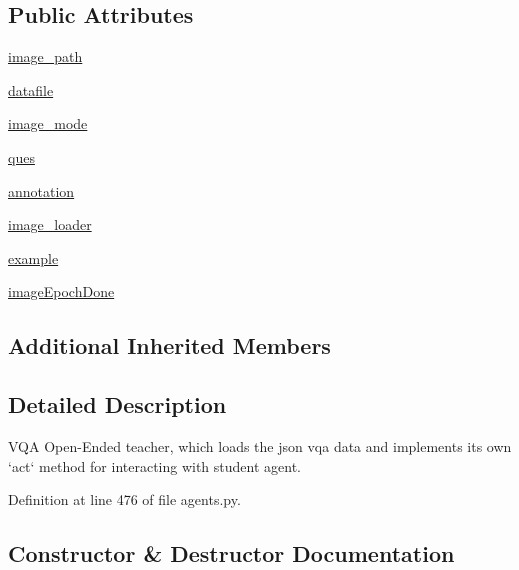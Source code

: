 \subsection*{Public Attributes}
\begin{DoxyCompactItemize}
\item 
\hyperlink{classparlai_1_1tasks_1_1vqa__v1_1_1agents_1_1OeTeacher_a93136db89c9b7943ff6aaeb28157d12e}{image\+\_\+path}
\item 
\hyperlink{classparlai_1_1tasks_1_1vqa__v1_1_1agents_1_1OeTeacher_a12671717135e971a2ec374079432b670}{datafile}
\item 
\hyperlink{classparlai_1_1tasks_1_1vqa__v1_1_1agents_1_1OeTeacher_ae600010b7db2aaf523db54fb0ef28906}{image\+\_\+mode}
\item 
\hyperlink{classparlai_1_1tasks_1_1vqa__v1_1_1agents_1_1OeTeacher_a180c1596f72999be0858a5c9c651c93a}{ques}
\item 
\hyperlink{classparlai_1_1tasks_1_1vqa__v1_1_1agents_1_1OeTeacher_ae7832c20e91858e3bbea62e333d585e5}{annotation}
\item 
\hyperlink{classparlai_1_1tasks_1_1vqa__v1_1_1agents_1_1OeTeacher_a658acd2bdd2d7c4fdd93fd0518423441}{image\+\_\+loader}
\item 
\hyperlink{classparlai_1_1tasks_1_1vqa__v1_1_1agents_1_1OeTeacher_ae9a071fc33afe67bfeae01dbd2857608}{example}
\item 
\hyperlink{classparlai_1_1tasks_1_1vqa__v1_1_1agents_1_1OeTeacher_a5db996acbd73e3fc6f45d69dd61fcefd}{image\+Epoch\+Done}
\end{DoxyCompactItemize}
\subsection*{Additional Inherited Members}


\subsection{Detailed Description}
\begin{DoxyVerb}VQA Open-Ended teacher, which loads the json vqa data and implements its own `act`
method for interacting with student agent.
\end{DoxyVerb}
 

Definition at line 476 of file agents.\+py.



\subsection{Constructor \& Destructor Documentation}
\mbox{\label{classparlai_1_1tasks_1_1vqa__v1_1_1agents_1_1OeTeacher_a508a90334629ef603b9520a98b5200a0}} 
